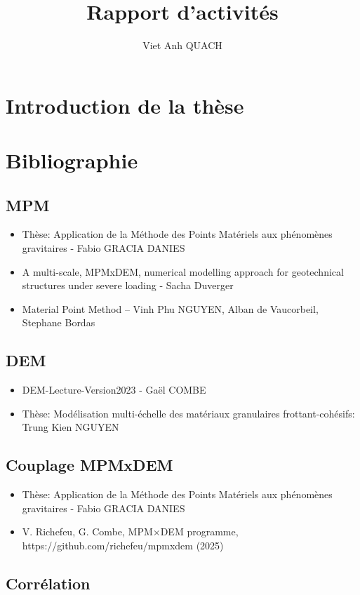 \documentclass[a4paper,12pt]{report}
\title{Rapport d'activités}
\author{Viet Anh QUACH}
\begin{document}
\maketitle
\tableofcontents

\setcounter{secnumdepth}{4}

\chapter{Introduction de la thèse}

\chapter{Bibliographie}
\section{MPM}
\begin{itemize}
\item Thèse: Application de la Méthode des Points Matériels aux phénomènes gravitaires - Fabio GRACIA DANIES
\item A multi-scale, MPMxDEM, numerical modelling approach for geotechnical structures under severe loading - Sacha Duverger
\item Material Point Method -- Vinh Phu NGUYEN, Alban de Vaucorbeil, Stephane Bordas
\end{itemize}
\section{DEM}
\begin{itemize}
      \item DEM-Lecture-Version2023 - Gaël COMBE
      \item Thèse: Modélisation multi-échelle des matériaux granulaires frottant-cohésifs: Trung Kien NGUYEN
\end{itemize}

\section{Couplage MPMxDEM}
\begin{itemize}
      \item Thèse: Application de la Méthode des Points Matériels aux phénomènes gravitaires - Fabio GRACIA DANIES
      \item V. Richefeu, G. Combe, MPM×DEM programme, https://github.com/richefeu/mpmxdem (2025)
\end{itemize}
\section{Corrélation}
\end{document}
